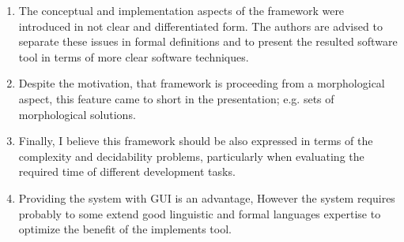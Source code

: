 \begin{enumerate}[leftmargin=0mm,label=\bfseries CommentR2.\arabic*]


\item \label{Review.2.1} 
The conceptual and implementation aspects of the framework 
were introduced in not clear and differentiated form. 
The authors are advised to separate these issues in formal 
definitions and to present the resulted software tool in 
terms of more clear software techniques.




\item \label{Review.2.2} 
Despite the motivation, that framework is proceeding from a 
morphological aspect, this feature came to short in the 
presentation; e.g. sets of morphological solutions.


\item \label{Review.2.3} 
Finally, I believe this framework should be also expressed 
in terms of the complexity and decidability problems, 
particularly when evaluating the required time of different 
development tasks. 

    
\item \label{Review.2.4} 
Providing the system with GUI is an advantage, 
However the system requires probably to some extend 
good linguistic and formal languages expertise to optimize 
the benefit of the implements tool.



\end{enumerate}
